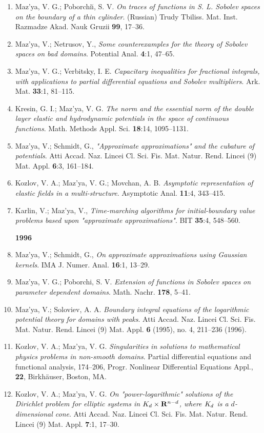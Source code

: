 \documentclass{article}
\begin{document}
\begin{enumerate}
{\bf 1995}
\item Maz'ya, V. G.; Poborchi{\u\i}, S. V. {\it On traces of functions
in
S. L. Sobolev spaces on the boundary of a thin cylinder}.
(Russian) Trudy Tbiliss. Mat. Inst. Razmadze Akad. Nauk Gruzii {\bf
99},
17--36.
\item Maz'ya, V.; Netrusov, Y., {\it Some counterexamples for the
theory of
Sobolev spaces on bad domains}.
Potential Anal. {\bf 4}:1, 47--65.
\item Maz'ya, V. G.; Verbitsky, I. E. {\it Capacitary inequalities for
fractional integrals,
with applications to partial differential equations and Sobolev
multipliers}. Ark. Mat. {\bf 33}:1, 81--115.
\item Kresin, G. I.; Maz'ya, V. G. {\it The norm and the essential
norm of
the double layer elastic and
hydrodynamic potentials in the space of continuous functions}. Math.
Methods Appl. Sci. {\bf 18}:14, 1095--1131.
\item Maz'ya, V.; Schmidt, G., {\it "Approximate approximations" and
the
cubature of potentials}. Atti Accad. Naz.
Lincei Cl. Sci. Fis. Mat. Natur. Rend. Lincei (9) Mat. Appl. {\bf
6}:3,
161--184.
\item Kozlov, V. A.; Maz'ya, V. G.; Movchan, A. B. {\it Asymptotic
representation of elastic fields in a multi-structure}.
Asymptotic Anal. {\bf 11}:4, 343--415.
\item Karlin, V.; Maz'ya, V., {\it Time-marching algorithms for
initial-boundary value problems
based upon "approximate approximations"}. BIT {\bf 35}:4, 548--560.
\hfill\break

{\bf 1996}
\item Maz'ya, V.; Schmidt, G., {\it On approximate approximations
using
Gaussian kernels}. IMA J. Numer. Anal. {\bf 16}:1,
13--29.
\item Maz'ya, V. G.; Poborchi, S. V. {\it Extension of functions in
Sobolev
spaces on parameter dependent
domains}. Math. Nachr. {\bf 178}, 5--41.
\item Maz'ya, V.; Soloviev, A. A. {\it Boundary integral equations of
the
logarithmic
potential theory for domains with peaks}. Atti Accad. Naz. Lincei Cl.
Sci.
Fis. Mat. Natur. Rend. Lincei (9) Mat. Appl. {\bf 6}
(1995), no. 4, 211--236 (1996).
\item Kozlov, V. A.; Maz'ya, V. G. {\it Singularities in solutions to
mathematical physics problems
in non-smooth domains}. Partial differential equations and functional
analysis, 174--206, Progr. Nonlinear Differential Equations
Appl., {\bf 22}, Birkh{\"a}user, Boston, MA.
\item Kozlov, V. A.; Maz'ya, V. G. {\it On "power-logarithmic"
solutions of
the Dirichlet problem
for elliptic systems in $K\sb d\times {\bf R}\sp {n-d}$, where $K\sb
d$ is
a $d$-dimensional cone}. Atti Accad. Naz. Lincei Cl. Sci.
Fis. Mat. Natur. Rend. Lincei (9) Mat. Appl. {\bf 7}:1,
17--30.\hfill\break


\end{enumerate}
\end{document}
